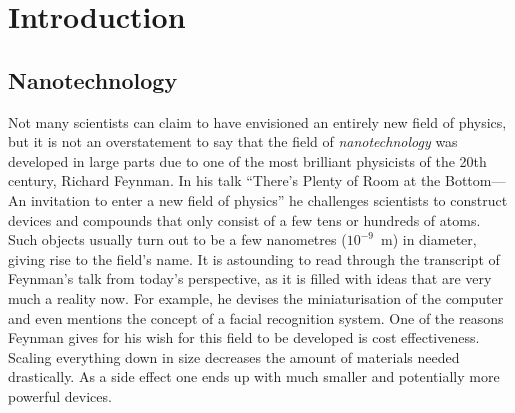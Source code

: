 
\chapter{Introduction}
\label{sec:introduction}

%
\section{Nanotechnology}
\label{sec:nanotechnology}

Not many scientists can claim to have envisioned an entirely new field of
physics, but it is not an overstatement to say that the field of
\emph{nanotechnology} was developed in large parts due to one of the most
brilliant physicists of the 20th century, Richard Feynman. In his talk ``There's
Plenty of Room at the Bottom---An invitation to enter a new field of
physics''\autocite{Feynman_TherePlentyRoom_1960} he challenges scientists to
construct devices and compounds that only consist of a few tens or hundreds of
atoms. Such objects usually turn out to be a few nanometres ($10^{-9}$~m) in
diameter, giving rise to the field's name. It is astounding to read through the
transcript of Feynman's talk from today's perspective, as it is filled with
ideas that are very much a reality now. For example, he devises the
miniaturisation of the computer and even mentions the concept of a facial
recognition system. One of the reasons Feynman gives for his wish for this field
to be developed is cost effectiveness. Scaling everything down in size decreases
the amount of materials needed drastically. As a side effect one ends up with
much smaller and potentially more powerful devices.


